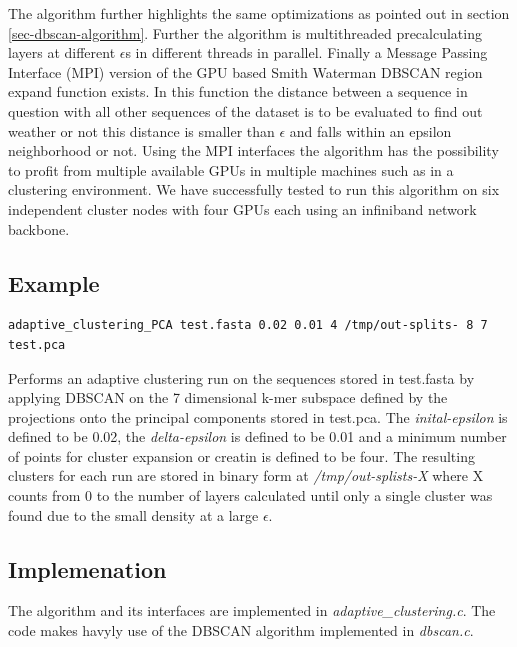 The algorithm further highlights the same optimizations as pointed out
in section \ref{sec-dbscan-algorithm}. Further the algorithm is
multithreaded precalculating layers at different $\epsilon$s in
different threads in parallel.
Finally a Message Passing Interface (MPI) version of the GPU based
Smith Waterman DBSCAN region expand function exists. In this function
the distance between a sequence in question with all other sequences
of the dataset is to be evaluated to find out weather or not this
distance is smaller than $\epsilon$ and falls within an epsilon
neighborhood or not. Using the MPI interfaces the algorithm has the
possibility to profit from multiple available GPUs in multiple
machines such as in a clustering environment. We have successfully
tested to run this algorithm on six independent cluster nodes with
four GPUs each using an infiniband network backbone.

\subsection{Example}

\begin{lstlisting}
adaptive_clustering_PCA test.fasta 0.02 0.01 4 /tmp/out-splits- 8 7 test.pca 
\end{lstlisting}
Performs an adaptive clustering run on the sequences stored in
test.fasta by applying DBSCAN on the 7 dimensional k-mer subspace
defined by the projections onto the principal components stored in
test.pca. The \emph{inital-epsilon} is defined to be 0.02, the
\emph{delta-epsilon} is defined to be 0.01 and a minimum number of
points for cluster expansion or creatin is defined to be four.
The resulting clusters for each run are stored in binary form at
\emph{/tmp/out-splists-X} where X counts from 0 to the number of
layers calculated until only a single cluster was found due to the
small density at a large $\epsilon$.

\subsection{Implemenation}
The algorithm and its interfaces are implemented in
\emph{adaptive\_clustering.c}. The code makes havyly use of the DBSCAN
algorithm implemented in \emph{dbscan.c}. 
